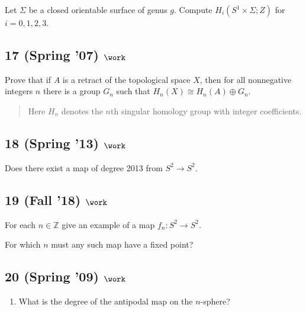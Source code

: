 Let \(\Sigma\) be a closed orientable surface of genus \(g\). Compute
\(H_i(S^1 \times \Sigma; Z)\) for \(i = 0, 1, 2, 3\).

\hypertarget{spring-07-work-2}{%
\subsection{\texorpdfstring{17 (Spring '07)
\(\work\)}{17 (Spring '07) \textbackslash work}}\label{spring-07-work-2}}

Prove that if \(A\) is a retract of the topological space \(X\), then
for all nonnegative integers \(n\) there is a group \(G_n\) such that
\(H_{n} (X) \cong H_{n} (A) \oplus G_n\).

\begin{quote}
Here \(H_{n}\) denotes the \(n\)th singular homology group with integer
coefficients.
\end{quote}

\hypertarget{spring-13-work-3}{%
\subsection{\texorpdfstring{18 (Spring '13)
\(\work\)}{18 (Spring '13) \textbackslash work}}\label{spring-13-work-3}}

Does there exist a map of degree 2013 from \(S^2 \to S^2\).

\hypertarget{fall-18-work-6}{%
\subsection{\texorpdfstring{19 (Fall '18)
\(\work\)}{19 (Fall '18) \textbackslash work}}\label{fall-18-work-6}}

For each \(n \in {\mathbb{Z}}\) give an example of a map
\(f_n : S^2 \to S^2\).

For which \(n\) must any such map have a fixed point?

\hypertarget{spring-09-work-5}{%
\subsection{\texorpdfstring{20 (Spring '09)
\(\work\)}{20 (Spring '09) \textbackslash work}}\label{spring-09-work-5}}

\begin{enumerate}
\def\labelenumi{\alph{enumi}.}
\tightlist
\item
  What is the degree of the antipodal map on the \(n\)-sphere?
\end{enumerate}

